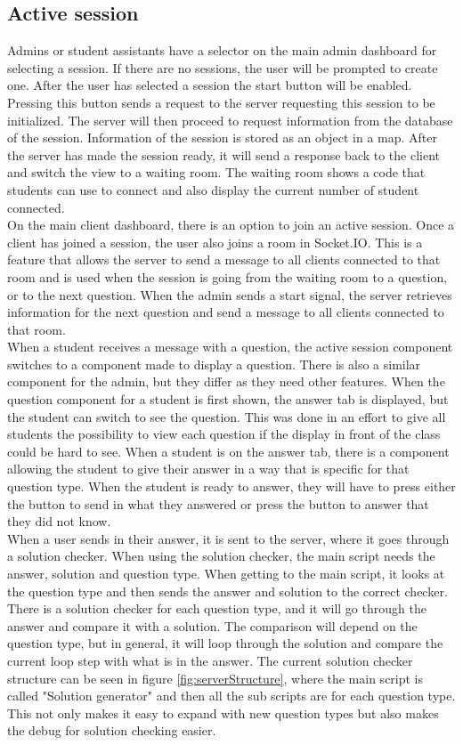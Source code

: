 \subsection{Active session}
Admins or student assistants have a selector on the main admin dashboard for selecting a session. If there are no sessions, the user will be prompted to create one. After the user has selected a session the start button will be enabled. Pressing this button sends a request to the server requesting this session to be initialized. The server will then proceed to request information from the database of the session. Information of the session is stored as an object in a map. After the server has made the session ready, it will send a response back to the client and switch the view to a waiting room. The waiting room shows a code that students can use to connect and also display the current number of student connected. 
\\[11pt]
On the main client dashboard, there is an option to join an active session. Once a client has joined a session, the user also joins a room in Socket.IO. This is a feature that allows the server to send a message to all clients connected to that room and is used when the session is going from the waiting room to a question, or to the next question. When the admin sends a start signal, the server retrieves information for the next question and send a message to all clients connected to that room.
\\[11pt]
When a student receives a message with a question, the active session component switches to a component made to display a question. There is also a similar component for the admin, but they differ as they need other features. When the question component for a student is first shown, the answer tab is displayed, but the student can switch to see the question. This was done in an effort to give all students the possibility to view each question if the display in front of the class could be hard to see. When a student is on the answer tab, there is a component allowing the student to give their answer in a way that is specific for that question type. When the student is ready to answer, they will have to press either the button to send in what they answered or press the button to answer that they did not know.
\\[11pt]
When a user sends in their answer, it is sent to the server, where it goes through a solution checker. When using the solution checker, the main script needs the answer, solution and question type. When getting to the main script, it looks at the question type and then sends the answer and solution to the correct checker. There is a solution checker for each question type, and it will go through the answer and compare it with a solution. The comparison will depend on the question type, but in general, it will loop through the solution and compare the current loop step with what is in the answer. The current solution checker structure can be seen in figure \ref{fig:serverStructure}, where the main script is called "Solution generator" and then all the sub scripts are for each question type. This not only makes it easy to expand with new question types but also makes the debug for solution checking easier.
